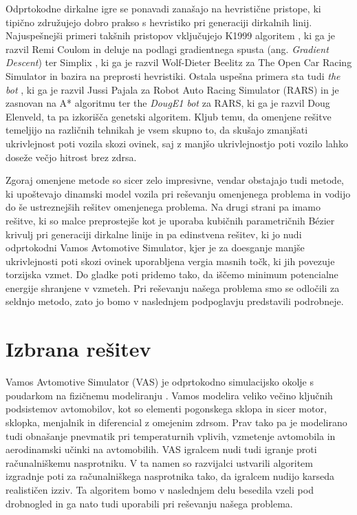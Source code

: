 Odprtokodne dirkalne igre se ponavadi zanašajo na hevristične pristope, ki tipično združujejo dobro prakso s hevristiko pri generaciji dirkalnih linij. Najuspešnejši primeri takšnih pristopov vključujejo K1999 algoritem \cite{vir5}, ki ga je razvil Remi Coulom in deluje na podlagi gradientnega spusta (ang. \textit{Gradient Descent}) ter Simplix \cite{vir6}, ki ga je razvil Wolf-Dieter Beelitz za The Open Car Racing Simulator in bazira na preprosti hevristiki. Ostala uspešna primera sta tudi \textit{the bot} \cite{vir7}, ki ga je razvil Jussi Pajala za Robot Auto Racing Simulator (RARS) in je zasnovan na A* algoritmu ter the \textit{DougE1 bot} za RARS, ki ga je razvil Doug Elenveld, ta pa izkorišča genetski algoritem. Kljub temu, da omenjene rešitve temeljijo na različnih tehnikah je vsem skupno to, da skušajo zmanjšati ukrivlejnost poti vozila skozi ovinek, saj z manjšo ukrivlejnostjo poti vozilo lahko doseže večjo hitrost brez zdrsa.

Zgoraj omenjene metode so sicer zelo impresivne, vendar obstajajo tudi metode, ki upoštevajo dinamski model vozila pri reševanju omenjenega problema in vodijo do še ustreznejših rešitev omenjenega problema. Na drugi strani pa imamo rešitve, ki so malce preprostejše kot je uporaba kubičnih parametričnih Bézier krivulj pri generaciji dirkalne linije \cite{vir8} in pa edinstvena rešitev, ki jo nudi odprtokodni Vamos Avtomotive Simulator, kjer je za doesganje manjše ukrivlejnosti poti skozi ovinek uporabljena vergia masnih točk, ki jih povezuje torzijska vzmet. Do gladke poti pridemo tako, da iščemo minimum potencialne energije shranjene v vzmeteh. Pri reševanju našega problema smo se odločili za seldnjo metodo, zato jo bomo v naslednjem podpoglavju predstavili podrobneje.

\section{Izbrana rešitev}

Vamos Avtomotive Simulator (VAS) je odprtokodno simulacijsko okolje s poudarkom na fizičnemu modeliranju \cite{vir9}. Vamos modelira veliko večino ključnih podsistemov avtomobilov, kot so elementi pogonskega sklopa in sicer motor, sklopka, menjalnik in diferencial z omejenim zdrsom. Prav tako pa je modelirano tudi obnašanje pnevmatik pri temperaturnih vplivih, vzmetenje avtomobila in aerodinamski učinki na avtomobilih. VAS igralcem nudi tudi igranje proti računalniškemu nasprotniku. V ta namen so razvijalci ustvarili algoritem izgradnje poti za računalniškega nasprotnika tako, da igralcem nudijo karseda realističen izziv. Ta algoritem bomo v naslednjem delu besedila vzeli pod drobnogled in ga nato tudi uporabili pri reševanju našega problema.

